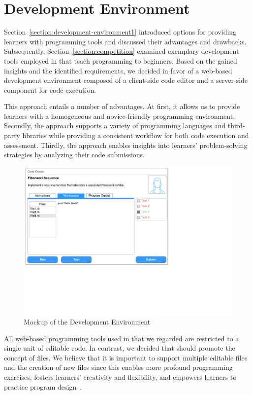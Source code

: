 \section{Development Environment}\label{section:development-environment2}

Section~\ref{section:development-environment1} introduced options for providing learners with programming tools and discussed their advantages and drawbacks. Subsequently, Section~\ref{section:competition} examined exemplary development tools employed in \moocs that teach programming to beginners. Based on the gained insights and the identified requirements, we decided in favor of a web-based development environment composed of a client-side code editor and a server-side component for code execution.

This approach entails a number of advantages. At first, it allows us to provide learners with a homogeneous and novice-friendly programming environment. Secondly, the approach supports a variety of programming languages and third-party libraries while providing a consistent workflow for both code execution and assessment. Thirdly, the approach enables insights into learners' problem-solving strategies by analyzing their code submissions.

\begin{figure}
\centering
\includegraphics[clip=true, trim=0.2cm 5.4cm 6.9cm 0.2cm, width=\textwidth]{images/mockup.pdf}
\caption{Mockup of the Development Environment}
\label{figure:mockup}
\end{figure}

All web-based programming tools used in \moocs that we regarded are restricted to a single unit of editable code. In contrast, we decided that \tool should promote the concept of files. We believe that it is important to support multiple editable files and the creation of new files since this enables more profound programming exercises, fosters learners' creativity and flexibility, and empowers learners to practice program design~\cite{pieterse2013automated}.

